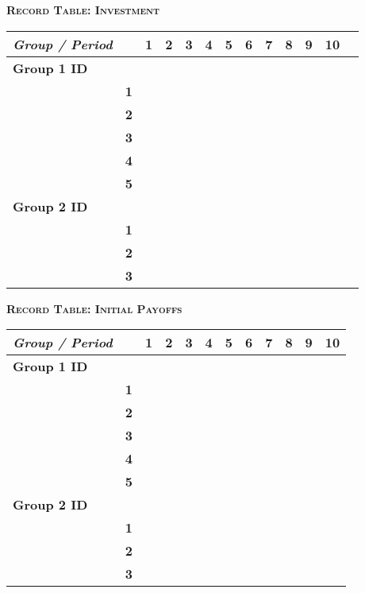 \newpage

\begin{landscape}


{\bf \scshape  Record Table: Investment}


\begin{table}[H]
\centering
\setlength{\tabcolsep}{20pt}
\begin{tabular}{|l|l|l|l|l|l|l|l|l|l|l|l|l|}
\hline
{\em Group / Period} & & {\bf 1} & {\bf 2} & {\bf 3} & {\bf 4} & {\bf 5} & {\bf 6} & {\bf 7} & {\bf 8} & {\bf 9} & {\bf 10}\\[0.5ex]
\hline\hline
{\bf Group 1 ID} & & & & & & & & & & &\\[0.5ex]
\hline
& {\bf 1} & & & & & & & & & &\\[0.5ex]
\hline
& {\bf 2} & & & & & & & & & & \\[0.5ex]
\hline
& {\bf 3} & & & & & & & & & & \\[0.5ex]
\hline
& {\bf 4} & & & & & & & & & & \\[0.5ex]
\hline
& {\bf 5} & & & & & & & & & &\\[0.5ex]
\hline
{\bf Group 2 ID} & & & & & & & & & & &\\[0.5ex]
\hline
& {\bf 1} & & & & & & & & & & \\[0.5ex]
\hline
& {\bf 2} & & & & & & & & & & \\[0.5ex]
\hline
& {\bf 3} & & & & & & & & & & \\[0.5ex]
\hline
\end{tabular}
\end{table}

{\bf \scshape  Record Table: Initial Payoffs}


\begin{table}[H]
\centering
\setlength{\tabcolsep}{20pt}
\begin{tabular}{|l|l|l|l|l|l|l|l|l|l|l|l|}
\hline
{\em Group / Period} & & {\bf 1} & {\bf 2} & {\bf 3} & {\bf 4} & {\bf 5} & {\bf 6} & {\bf 7} & {\bf 8} & {\bf 9} & {\bf 10}\\[0.5ex]
\hline\hline
{\bf Group 1 ID} & & & & & & & & & & &\\[0.5ex]
\hline	
& {\bf 1} & & & & & & & & & &\\[0.5ex]
\hline
& {\bf 2} & & & & & & & & & & \\[0.5ex]
\hline
& {\bf 3} & & & & & & & & & & \\[0.5ex]
\hline
& {\bf 4} & & & & & & & & & & \\[0.5ex]
\hline
& {\bf 5} & & & & & & & & & &\\[0.5ex]
\hline
{\bf Group 2 ID} & & & & & & & & & & &\\[0.5ex]
\hline
& {\bf 1} & & & & & & & & & & \\[0.5ex]
\hline
& {\bf 2} & & & & & & & & & & \\[0.5ex]
\hline
& {\bf 3} & & & & & & & & & & \\[0.5ex]
\hline
\end{tabular}
\end{table}


\end{landscape}

